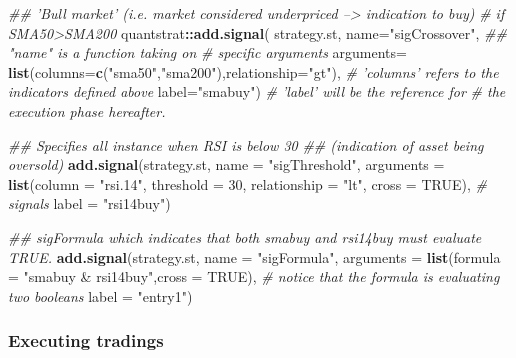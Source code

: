 \documentclass[
  11pt,
]{article}
\newenvironment{Shaded}{\begin{snugshade}}{\end{snugshade}}
\newcommand{\CommentTok}[1]{\textcolor[rgb]{0.56,0.35,0.01}{\textit{#1}}}
\newcommand{\DataTypeTok}[1]{\textcolor[rgb]{0.13,0.29,0.53}{#1}}
\newcommand{\DecValTok}[1]{\textcolor[rgb]{0.00,0.00,0.81}{#1}}
\newcommand{\KeywordTok}[1]{\textcolor[rgb]{0.13,0.29,0.53}{\textbf{#1}}}
\newcommand{\NormalTok}[1]{#1}
\newcommand{\OperatorTok}[1]{\textcolor[rgb]{0.81,0.36,0.00}{\textbf{#1}}}
\newcommand{\OtherTok}[1]{\textcolor[rgb]{0.56,0.35,0.01}{#1}}
\newcommand{\StringTok}[1]{\textcolor[rgb]{0.31,0.60,0.02}{#1}}
\begin{document}
\begin{Shaded}
\begin{Highlighting}[]
\CommentTok{## 'Bull market' (i.e. market considered underpriced --> indication to buy) }
\CommentTok{# if SMA50>SMA200}
\NormalTok{quantstrat}\OperatorTok{::}\KeywordTok{add.signal}\NormalTok{(}
\NormalTok{  strategy.st, }\DataTypeTok{name=}\StringTok{"sigCrossover"}\NormalTok{, }\CommentTok{## "name" is a function taking on}
           \CommentTok{# specific arguments }
           \DataTypeTok{arguments=} \KeywordTok{list}\NormalTok{(}\DataTypeTok{columns=}\KeywordTok{c}\NormalTok{(}\StringTok{"sma50"}\NormalTok{,}\StringTok{"sma200"}\NormalTok{),}\DataTypeTok{relationship=}\StringTok{"gt"}\NormalTok{), }
            \CommentTok{# 'columns' refers to the indicators defined above}
           \DataTypeTok{label=}\StringTok{"smabuy"}\NormalTok{) }\CommentTok{# 'label' will be the reference for }
\CommentTok{# the execution phase hereafter.}

\CommentTok{## Specifies all instance when RSI is below 30 }
\CommentTok{## (indication of asset being oversold)}
\KeywordTok{add.signal}\NormalTok{(strategy.st, }\DataTypeTok{name =} \StringTok{"sigThreshold"}\NormalTok{,}
           \DataTypeTok{arguments =} 
             \KeywordTok{list}\NormalTok{(}\DataTypeTok{column =} \StringTok{"rsi.14"}\NormalTok{, }\DataTypeTok{threshold =} \DecValTok{30}\NormalTok{, }\DataTypeTok{relationship =} \StringTok{"lt"}\NormalTok{, }
                  \DataTypeTok{cross =} \OtherTok{TRUE}\NormalTok{), }\CommentTok{# signals }
           \DataTypeTok{label =} \StringTok{"rsi14buy"}\NormalTok{)}

\CommentTok{## sigFormula which indicates that both smabuy and rsi14buy must evaluate TRUE.}
\KeywordTok{add.signal}\NormalTok{(strategy.st, }\DataTypeTok{name =} \StringTok{"sigFormula"}\NormalTok{,}
           \DataTypeTok{arguments =} \KeywordTok{list}\NormalTok{(}\DataTypeTok{formula =} \StringTok{"smabuy & rsi14buy"}\NormalTok{,}\DataTypeTok{cross =} \OtherTok{TRUE}\NormalTok{),}
           \CommentTok{# notice that the formula is evaluating two booleans }
           \DataTypeTok{label =} \StringTok{"entry1"}\NormalTok{) }
\end{Highlighting}
\end{Shaded}

\hypertarget{executing-tradings}{%
\subsubsection{Executing tradings}\label{executing-tradings}}
\end{document}
